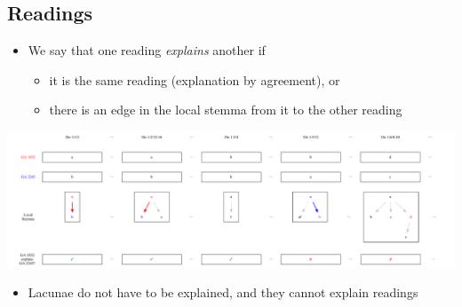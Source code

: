 \documentclass[10pt]{beamer}
\begin{document}
	\subsection{ Readings}
	\begin{frame}
		\begin{itemize}
			\item We say that one reading \emph{explains} another if
			\begin{itemize}
				\item it is the same reading (explanation by agreement), or
				\item there is an edge in the local stemma from it to the other reading
			\end{itemize}
		\end{itemize}
		\begin{center}
			\includegraphics[width=\textwidth]{../img/explained-readings.pdf}
		\end{center}
		\begin{itemize}
			\item Lacunae do not have to be explained, and they cannot explain readings
		\end{itemize}
	\end{frame}
\end{document}
